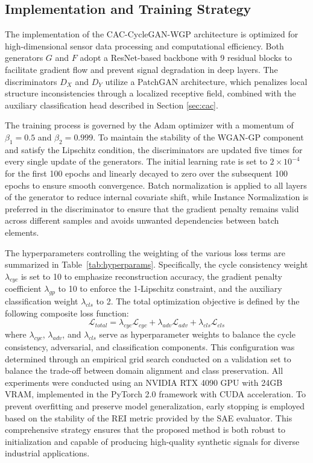 \documentclass[conference,twocolumn]{IEEEtran}
\begin{document}
\subsection{Implementation and Training Strategy}
\label{sec:implementation}

The implementation of the CAC-CycleGAN-WGP architecture is optimized for high-dimensional sensor data processing and computational efficiency. Both generators $G$ and $F$ adopt a ResNet-based backbone with 9 residual blocks to facilitate gradient flow and prevent signal degradation in deep layers. The discriminators $D_X$ and $D_Y$ utilize a PatchGAN architecture, which penalizes local structure inconsistencies through a localized receptive field, combined with the auxiliary classification head described in Section \ref{sec:cac}.

The training process is governed by the Adam optimizer \cite{Kingma2015} with a momentum of $\beta_1 = 0.5$ and $\beta_2 = 0.999$. To maintain the stability of the WGAN-GP component and satisfy the Lipschitz condition, the discriminators are updated five times for every single update of the generators. The initial learning rate is set to $2 \times 10^{-4}$ for the first 100 epochs and linearly decayed to zero over the subsequent 100 epochs to ensure smooth convergence. Batch normalization is applied to all layers of the generator to reduce internal covariate shift, while Instance Normalization is preferred in the discriminator to ensure that the gradient penalty remains valid across different samples and avoids unwanted dependencies between batch elements.

The hyperparameters controlling the weighting of the various loss terms are summarized in  Table~\ref{tab:hyperparams}. Specifically, the cycle consistency weight $\lambda_{cyc}$ is set to 10 to emphasize reconstruction accuracy, the gradient penalty coefficient $\lambda_{gp}$ to 10 to enforce the 1-Lipschitz constraint, and the auxiliary classification weight $\lambda_{cls}$ to 2. The total optimization objective is defined by the following composite loss function:
\begin{equation}
\mathcal{L}_{total} = \lambda_{cyc}\mathcal{L}_{cyc} + \lambda_{adv}\mathcal{L}_{adv} + \lambda_{cls}\mathcal{L}_{cls}
\label{eq:total_loss}
\end{equation}
where $\lambda_{cyc}$, $\lambda_{adv}$, and $\lambda_{cls}$ serve as hyperparameter weights to balance the cycle consistency, adversarial, and classification components. This configuration was determined through an empirical grid search conducted on a validation set to balance the trade-off between domain alignment and class preservation. All experiments were conducted using an NVIDIA RTX 4090 GPU with 24GB VRAM, implemented in the PyTorch 2.0 framework with CUDA acceleration. To prevent overfitting and preserve model generalization, early stopping is employed based on the stability of the REI metric provided by the SAE evaluator. This comprehensive strategy ensures that the proposed method is both robust to initialization and capable of producing high-quality synthetic signals for diverse industrial applications.
\end{document}
